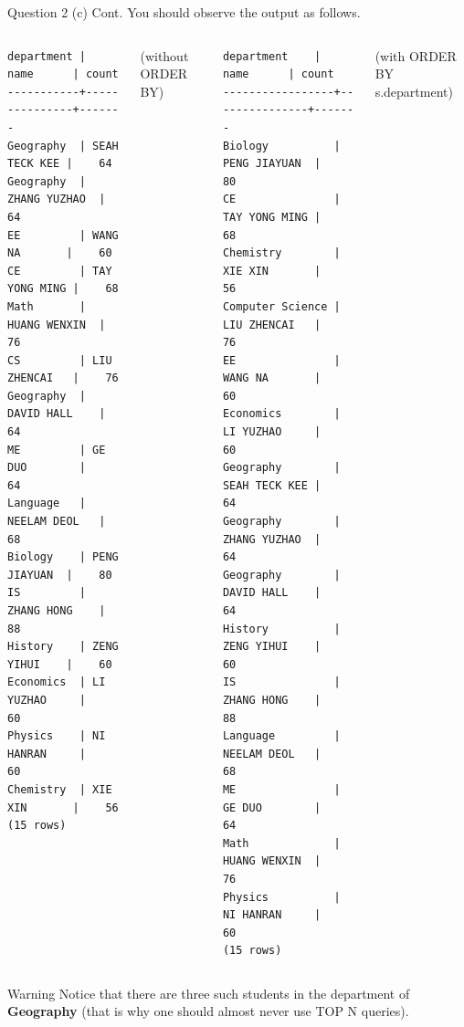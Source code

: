 \begin{frame}[fragile]{Question 2 (c) Cont.}
You should observe the output as follows.\\

\begin{columns}[t]
\begin{lstlisting}[style=terminal-tiny]	
department |     name      | count
-----------+---------------+-------
Geography  | SEAH TECK KEE |    64
Geography  | ZHANG YUZHAO  |    64
EE         | WANG NA       |    60
CE         | TAY YONG MING |    68
Math       | HUANG WENXIN  |    76
CS         | LIU ZHENCAI   |    76
Geography  | DAVID HALL    |    64
ME         | GE DUO        |    64
Language   | NEELAM DEOL   |    68
Biology    | PENG JIAYUAN  |    80
IS         | ZHANG HONG    |    88
History    | ZENG YIHUI    |    60
Economics  | LI YUZHAO     |    60
Physics    | NI HANRAN     |    60
Chemistry  | XIE XIN       |    56
(15 rows)
\end{lstlisting}
(without ORDER BY)\\

\begin{lstlisting}[style=terminal-tiny]	
   department    |     name      | count 
-----------------+---------------+-------
Biology          | PENG JIAYUAN  |    80
CE               | TAY YONG MING |    68
Chemistry        | XIE XIN       |    56
Computer Science | LIU ZHENCAI   |    76
EE               | WANG NA       |    60
Economics        | LI YUZHAO     |    60
Geography        | SEAH TECK KEE |    64
Geography        | ZHANG YUZHAO  |    64
Geography        | DAVID HALL    |    64
History          | ZENG YIHUI    |    60
IS               | ZHANG HONG    |    88
Language         | NEELAM DEOL   |    68
ME               | GE DUO        |    64
Math             | HUANG WENXIN  |    76
Physics          | NI HANRAN     |    60
(15 rows)
\end{lstlisting}
(with ORDER BY s.department)

\end{columns}

\begin{alertblock}{Warning}
	Notice that there are three such students in the department of \textbf{Geography}  (that is why one should almost never use TOP N queries). 	
\end{alertblock}
\end{frame}


